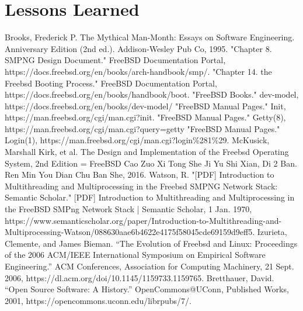 \documentclass[12pt, dvipsnames, a4paper]{article}
\begin{document}
\section{Lessons Learned}
\lipsum[1]

\begin{thebibliography}{00}
	 Brooks, Frederick P. The Mythical Man-Month: Essays on Software Engineering. Anniversary Edition (2nd ed.). Addison-Wesley Pub Co, 1995.
	 "Chapter 8. SMPNG Design Document." FreeBSD Documentation Portal, https://docs.freebsd.org/en/books/arch-handbook/smp/.
	 "Chapter 14. the Freebsd Booting Process." FreeBSD Documentation Portal, https://docs.freebsd.org/en/books/handbook/boot.
	 "FreeBSD Books." dev-model, https://docs.freebsd.org/en/books/dev-model/
	 "FreeBSD Manual Pages." Init, https://man.freebsd.org/cgi/man.cgi?init.
	 "FreeBSD Manual Pages." Getty(8), https://man.freebsd.org/cgi/man.cgi?query=getty
	 "FreeBSD Manual Pages." Login(1), https://man.freebsd.org/cgi/man.cgi?login\%281\%29.
	 McKusick, Marshall Kirk, et al. The Design and Implementation of the Freebsd Operating System, 2nd Edition = FreeBSD Cao Zuo Xi Tong She Ji Yu Shi Xian, Di 2 Ban. Ren Min You Dian Chu Ban She, 2016.
	 Watson, R. "[PDF] Introduction to Multithreading and Multiprocessing in the Freebsd SMPNG Network Stack: Semantic Scholar." [PDF]  Introduction to Multithreading and Multiprocessing in the FreeBSD SMPng Network Stack | Semantic Scholar, 1 Jan. 1970, https://www.semanticscholar.org/paper/Introduction-to-Multithreading-and-Multiprocessing-Watson/088630aae6b4622e4175f58045cde69159d9eff5.
	Izurieta, Clemente, and James Bieman. “The Evolution of Freebsd and Linux: Proceedings of the 2006 ACM/IEEE International Symposium on Empirical Software Engineering.” ACM Conferences, Association for Computing Machinery, 21 Sept. 2006, https://dl.acm.org/doi/10.1145/1159733.1159765. 
	Bretthauer, David. “Open Source Software: A History.” OpenCommons@UConn, Published Works, 2001, https://opencommons.uconn.edu/librpubs/7/. 
\end{thebibliography}
\end{document}
